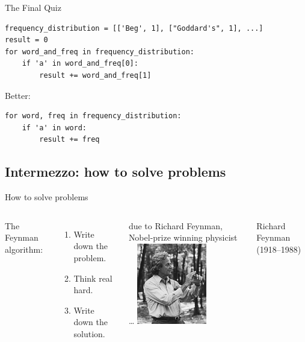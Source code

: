 \documentclass[aspectratio=169,usenames,dvipsnames]{beamer}
\begin{document}
\begin{frame}[fragile]{The Final Quiz}
\begin{lstlisting}
frequency_distribution = [['Beg', 1], ["Goddard's", 1], ...]
result = 0
for word_and_freq in frequency_distribution:
    if 'a' in word_and_freq[0]:
        result += word_and_freq[1]
\end{lstlisting}

\pause
Better:
\begin{lstlisting}
for word, freq in frequency_distribution:
    if 'a' in word:
        result += freq
\end{lstlisting}
\end{frame}


\subsection{Intermezzo: how to solve problems}
\frame{\tableofcontents[currentsubsection]}

\begin{frame}{How to solve problems}
    \begin{columns}
            The Feynman algorithm:
            \begin{enumerate}
                \item Write down the problem.
                \item Think real hard.
                \item Write down the solution.
            \end{enumerate}

            \vspace{1em}
            due to Richard Feynman, \\
            Nobel-prize winning physicist \dots
        \centering
            \includegraphics[width=0.6\textwidth]{fig/feynman}

            \vspace{1em} Richard Feynman (1918--1988)
    \end{columns}
\end{frame}
\end{document}
